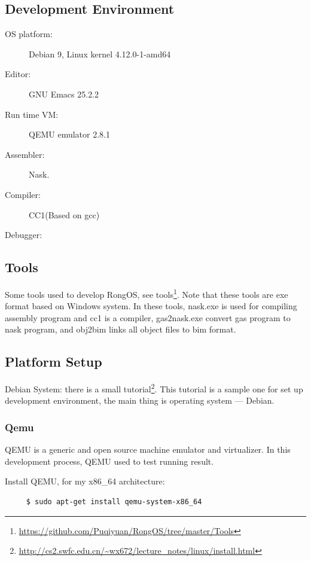 \documentclass{swfcthesis}
\begin{document}
\subsection{Development Environment}
\label{sec:devel-envir}

\begin{description}
\item[OS platform:] Debian 9, Linux kernel 4.12.0-1-amd64
\item[Editor:] GNU Emacs 25.2.2
\item[Run time VM:] QEMU emulator 2.8.1
\item[Assembler:]Nask.
\item[Compiler:] CC1(Based on gcc)
\item[Debugger:] 
\end{description}

\subsection{Tools}
\label{sec:tools}

Some tools used to develop RongOS, see
tools\footnote{\url{https://github.com/Puqiyuan/RongOS/tree/master/Tools}}.
Note that these tools are exe format based on Windows system. In these tools, nask.exe is
used for compiling assembly program and cc1 is a compiler, gas2nask.exe convert gas
program to nask program, and obj2bim links all object files to bim format.


\subsection{Platform Setup}
\label{sec:install}

Debian System: there is a small
tutorial\footnote{\url{http://cs2.swfc.edu.cn/~wx672/lecture_notes/linux/install.html}}. This tutorial is a sample one for set up development environment,
the main thing is operating system --- Debian.

\subsubsection{Qemu}
\label{sec:qemu}

QEMU is a generic and open source machine emulator and virtualizer. In this development
process, QEMU used to test running result.

Install QEMU, for my x86\_64 architecture: 
\begin{verbatim}
     $ sudo apt-get install qemu-system-x86_64
\end{verbatim}
\end{document}
